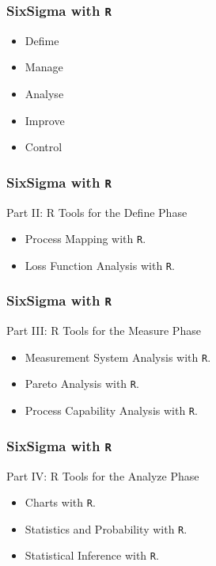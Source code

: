 \documentclass{beamer}
\begin{document}
\begin{frame}
\frametitle{SixSigma with \texttt{R}}
\Large
\begin{itemize}
\item Defime
\item Manage
\item Analyse
\item Improve
\item Control
\end{itemize}

\end{frame}
\begin{frame}
\frametitle{SixSigma with \texttt{R}}
\Large
Part II: R Tools for the Define Phase

\begin{itemize}
\item Process Mapping with \texttt{R}. 

\item Loss Function Analysis with \texttt{R}. 
\end{itemize}
\end{frame}
\begin{frame}
\frametitle{SixSigma with \texttt{R}}
\Large
Part III: R Tools for the Measure Phase
\begin{itemize}
\item  Measurement System Analysis with \texttt{R}. 

\item Pareto Analysis with \texttt{R}. 

\item Process Capability Analysis with \texttt{R}. 
\end{itemize}
\end{frame}
\begin{frame}
\frametitle{SixSigma with \texttt{R}}
\Large
Part IV: R Tools for the Analyze Phase

\begin{itemize}
\item  Charts with \texttt{R}. 

\item  Statistics and Probability with \texttt{R}. 

\item  Statistical Inference with \texttt{R}. 
\end{itemize}
\end{frame}
\end{document}
